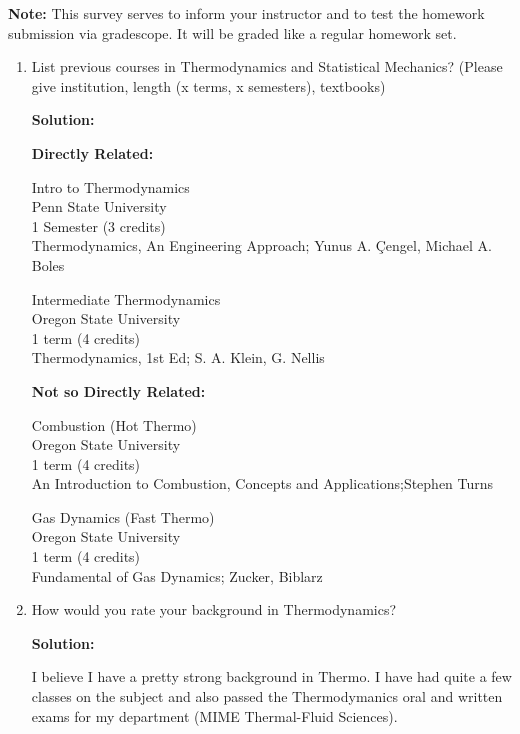 \documentclass[10pt]{article}
\newenvironment{Solution}
    {\textbf{Solution:}
    
    \vspace{5mm}
    \begin{tcolorbox}
    }
    {
    \end{tcolorbox}
    \vspace{5mm}
    }
\begin{document}
\noindent\textbf{Note:} This survey serves to inform your instructor and to test the homework submission via gradescope. It will be graded like a regular homework set.

\begin{enumerate}



\item List previous courses in Thermodynamics and Statistical Mechanics? (Please give institution, length (x terms,  x semesters), textbooks)

\begin{Solution}
\textbf{Directly Related:}
\vspace{1mm}

Intro to Thermodynamics\\Penn State University \\1 Semester (3 credits)\\Thermodynamics, An Engineering Approach; Yunus A. Çengel, Michael A. Boles
\vspace{5mm}

Intermediate Thermodynamics\\Oregon State University\\1 term (4 credits)\\Thermodynamics,  1st Ed; S. A. Klein,  G. Nellis
\vspace{5mm}

\textbf{Not so Directly Related:}
\vspace{1mm}

Combustion (Hot Thermo)\\Oregon State University\\1 term (4 credits)\\An Introduction to Combustion, Concepts and Applications;Stephen Turns
\vspace{5mm}

Gas Dynamics (Fast Thermo)\\Oregon State University\\1 term (4 credits)\\Fundamental of Gas Dynamics; Zucker, Biblarz

\end{Solution}

\item How would you rate your background in Thermodynamics? 

\begin{Solution}
I believe I have a pretty strong background in Thermo. I have had quite a few classes on the subject and also passed the Thermodymanics oral and written exams for my department (MIME Thermal-Fluid Sciences).


\end{Solution}
\end{enumerate}
\end{document}
